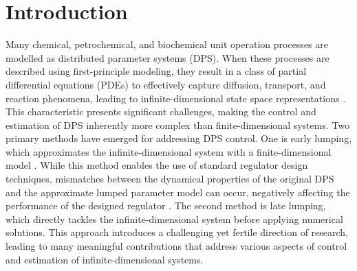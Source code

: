 \newpage
\section{Introduction}

Many chemical, petrochemical, and biochemical unit operation processes are modelled as distributed parameter systems (DPS). When these processes are described using first-principle modeling, they result in a class of partial differential equations (PDEs) to effectively capture diffusion, transport, and reaction phenomena, leading to infinite-dimensional state space representations \autocite{ray1981advanced}. This characteristic presents significant challenges, making the control and estimation of DPS inherently more complex than finite-dimensional systems. Two primary methods have emerged for addressing DPS control. One is early lumping, which approximates the infinite-dimensional system with a finite-dimensional model \autocite{davison1976robust, francis1977linear}. While this method enables the use of standard regulator design techniques, mismatches between the dynamical properties of the original DPS and the approximate lumped parameter model can occur, negatively affecting the performance of the designed regulator \autocite{moghadam2012infinite}. The second method is late lumping, which directly tackles the infinite-dimensional system before applying numerical solutions. This approach introduces a challenging yet fertile direction of research, leading to many meaningful contributions that address various aspects of control and estimation of infinite-dimensional systems.


